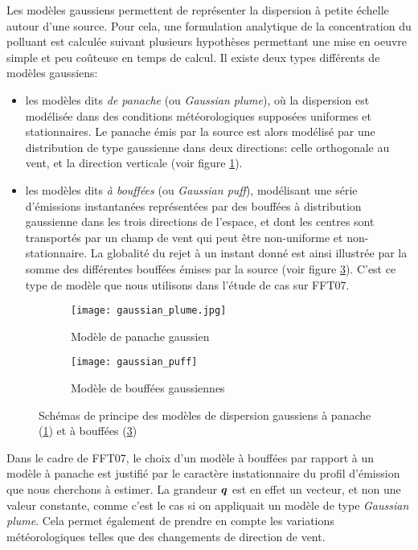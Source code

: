 {Les modèles gaussiens permettent de représenter la dispersion à petite échelle autour d'une source. Pour cela, une formulation analytique de la concentration du polluant est calculée suivant plusieurs hypothèses permettant une mise en oeuvre simple et peu coûteuse en temps de calcul. Il existe deux types différents de modèles gaussiens:\\

\begin{itemize}
	\item les modèles dits \textit{de panache} (ou \textit{Gaussian plume}), où la dispersion est modélisée dans des conditions météorologiques supposées uniformes et stationnaires. Le panache émis par la source est alors modélisé par une distribution de type gaussienne dans deux directions: celle orthogonale au vent, et la direction verticale (voir figure \ref{gaussian_plume}).
	\item les modèles dits \textit{à bouffées} (ou \textit{Gaussian puff}), modélisant une série d'émissions instantanées représentées par des bouffées à distribution gaussienne dans les trois directions de l'espace, et dont les centres sont transportés par un champ de vent qui peut  être non-uniforme et non-stationnaire. La globalité du rejet à un instant donné est ainsi illustrée par la somme des différentes bouffées émises par la source (voir figure \ref{gaussian_puff}). C'est ce type de modèle que nous utilisons dans l'étude de cas sur FFT07.
\end{itemize}

 \begin{figure}[h!]
 	\label{fig_gaussian_models}	
 	\centering
 	\begin{subfigure}[t]{0.5\textwidth}
 		\centering
 		\texttt{[image: gaussian\_plume.jpg]}
 		\caption{Modèle de panache gaussien \cite{Schulze1996}}
 		\label{gaussian_plume}
 	\end{subfigure}%
 	\begin{subfigure}[t]{0.5\textwidth}
 		\centering
 		\texttt{[image: gaussian\_puff]}
 		\caption{Modèle de bouffées gaussiennes}
 		\label{gaussian_puff}
 	\end{subfigure}
 	
 	\caption{Schémas de principe des modèles de dispersion gaussiens à panache (\ref{gaussian_plume}) et à bouffées (\ref{gaussian_puff})}
 \end{figure}
 
 Dans le cadre de FFT07, le choix d'un modèle à bouffées par rapport à un modèle à panache est justifié par {le caractère instationnaire} du profil d'émission que nous cherchons à estimer. La grandeur ${\bm{q}}$ est en effet un vecteur, et non une valeur constante, comme c'est le cas si on appliquait un modèle de type \textit{Gaussian plume}. Cela permet également de prendre en compte les variations météorologiques telles que des changements de direction de vent. \\
 
}
